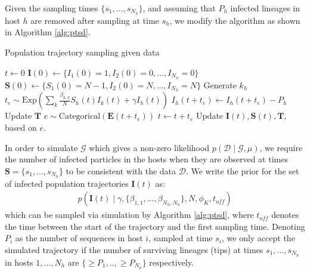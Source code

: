 \documentclass[a4paper,18pt]{report}
\begin{document}
Given the sampling times $\{s_1,...,s_{N_h}\}$, and assuming that $P_h$ infected lineages in host $h$  are removed after sampling at time $s_h$, we modify the algorithm as shown in Algorithm \ref{alg:ptsd}.
\begin{algorithm}
\caption{Population trajectory sampling given data \label{alg:ptsd}}
\begin{algorithmic}
\STATE $t\gets 0$
\STATE $\mathbf{I}(0)\gets\{I_1(0)=1, I_2(0)=0, ..., I_{N_h}=0\}$
\STATE $\mathbf{S}(0)\gets\{S_1(0)=N-1, I_2(0)=N, ..., I_{N_h}=N\}$
\STATE Generate $k_h$
\STATE $t_e \sim \textrm{Exp}(\sum_k \frac{\beta_{h,k}}{N}S_h(t)I_k(t) + \gamma I_h(t))$ 
{ 
\STATE $I_h(t+t_e)\gets I_h(t+t_e) - P_h$ 
\STATE Update $\mathbf{T}$
\ENDIF}
\ENDFOR
\STATE $e \sim \textrm{Categorical}(\mathbf{E}(t+t_e))$  
\STATE $t \gets t+t_e$
\STATE Update $\mathbf{I}(t), \mathbf{S}(t), \mathbf{T}$, based on $e$.
\ENDWHILE
\end{algorithmic}
\end{algorithm}
In order to simulate $\mathcal{G}$ which gives a non-zero likelihood $p(\mathcal{D}\mid \mathcal{G}, \mu)$, we require the number of infected particles in the hosts when they are observed at times $\mathbf{S}=\{s_1,...,s_{N_h}\}$ to be consistent with the data $\mathcal{D}$.  We write the prior for the set of infected population trajectories $\mathbf{I}(t)$ as:
\begin{eqnarray}
p(\mathbf{I}(t) \mid  \gamma, \{\beta_{1,1},...,\beta_{N_h,N_h}\}, N, \phi_K, t_{off})
\end{eqnarray}
which can be sampled via simulation by Algorithm \ref{alg:ptsd}, where $t_{off}$ denotes the time between the start of the trajectory and the first sampling time. Denoting $P_i$ as the number of sequences in host $i$, sampled at time $s_i$, we only accept the simulated trajectory if the number of surviving lineages (tips) at times $s_1,...,s_{N_h}$ in hosts $1,...,N_h$ are $\{ \geq P_1,..,\geq P_{N_h}\} $ respectively.
\end{document}
